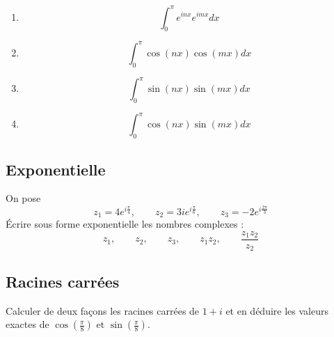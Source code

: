 \begin{enumerate}
    \item $$\int_0^\pi e^{i n x} e^{i m x} dx$$
    \item $$\int_0^\pi \cos(n x) \cos(m x) dx$$
    \item $$\int_0^\pi \sin(n x) \sin(m x) dx$$
    \item $$\int_0^\pi \cos(n x) \sin(m x) dx$$
\end{enumerate}



\vspace{2em}

\subsection{Exponentielle}
On pose 
$$z_1=4 e^{i \frac{\pi}{4}}, \qquad z_2=3 i e^{i \frac{\pi}{6}}, \qquad z_3=-2 e^{i \frac{2 \pi}{3}}$$
Écrire sous forme exponentielle les nombres complexes : 
$$z_1,\qquad z_2,\qquad z_3 , \qquad z_1 z_2, \qquad \frac{z_1 z_2}{z_2}$$



\vspace{2em}

\subsection{Racines carrées}
Calculer de deux façons les racines carrées de $1+i$ et en déduire les valeurs exactes de $\cos \left(\frac{\pi}{8}\right)$ et $\sin \left(\frac{\pi}{8}\right)$.